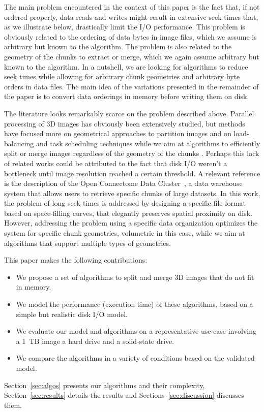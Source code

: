 \documentclass[10pt, conference, compsocconf]{IEEEtran}
\newcommand{\todo}[1]{\marginpar{\parbox{18mm}{\flushleft\tiny\color{red}\textbf{TODO}:
      #1}}}
\begin{document}
The main problem encountered in the context of this paper is the fact
that, if not ordered properly, data reads and writes might result in
extensive seek times that, as we illustrate below, drastically limit
the I/O performance. This problem is obviously related to the ordering
of data bytes in image files, which we assume is arbitrary but known
to the algorithm. The problem is also related to the geometry of the
chunks to extract or merge, which we again assume arbitrary but known
to the algorithm. In a nutshell, we are looking for algorithms to
reduce seek times while allowing for arbitrary chunk geometries and
arbitrary byte orders in data files. The main idea of the variations
presented in the remainder of the paper is to convert data orderings
in memory before writing them on disk. 

The literature looks remarkably scarce on the problem described
above. Parallel processing of 3D images has obviously been extensively
studied, but methods have focused more on geometrical approaches to
partition images and on load-balancing and task scheduling techniques
while we aim at algorithms to efficiently split or merge images
regardless of the geometry of the chunks \todo{do a serious literature
review on this topic}. Perhaps this lack of related works could be
attributed to the fact that disk I/O weren't a bottleneck until image
resolution reached a certain threshold. A relevant reference is the
description of the Open Connectome Data Cluster~\cite{burns2013open},
a data warehouse system that allows users to retrieve specific chunks
of large datasets. In this work, the problem of long seek times is
addressed by designing a specific file format based on space-filling
curves, that elegantly preserves spatial proximity on disk. However,
addressing the problem using a specific data organization optimizes
the system for specific chunk geometries, volumetric in this case,
while we aim at algorithms that support multiple types of geometries.

This paper makes the following contributions:
\begin{itemize}
  \item We propose a set of algorithms to split and merge 3D images
    that do not fit in memory.
  \item We model the performance (execution time) of these algorithms,
    based on a simple but realistic disk I/O model.
  \item We evaluate our model and algorithms on a representative
    use-case involving a 1~TB image a hard drive and a solid-state
    drive.
  \item We compare the algorithms in a variety of conditions based on the validated model.
\end{itemize}
Section~\ref{sec:algos} presents our algorithms and their complexity,
Section~\ref{sec:results} details the results and
Sections~\ref{sec:discussion} discusses them.
\end{document}
